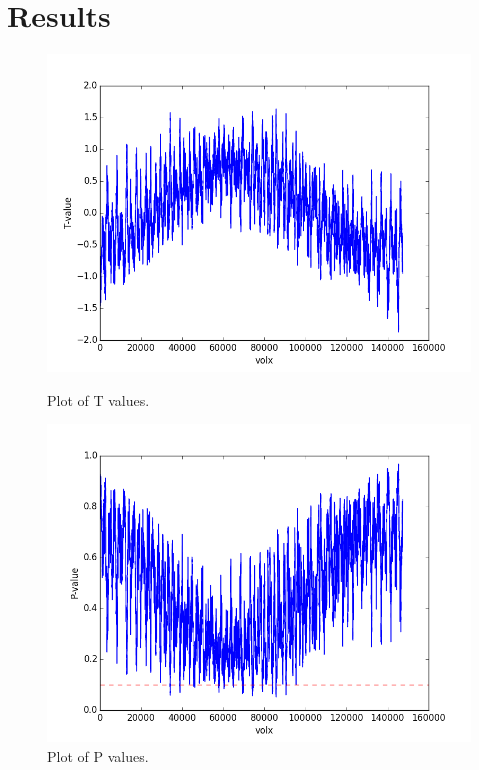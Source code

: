 \documentclass[11pt]{article}
\begin{document}
\section{Results}
\begin{figure}[!htb]
  \centering
  \begin{minipage}[b]{0.4\textwidth}
    \includegraphics[width=\textwidth]{T_value}
    \caption{Plot of T values.}
  \end{minipage}
  \hfill
  \begin{minipage}[b]{0.4\textwidth}
    \includegraphics[width=\textwidth]{p_value}
    \caption{Plot of P values.}
  \end{minipage}
\end{figure}
\end{document}
